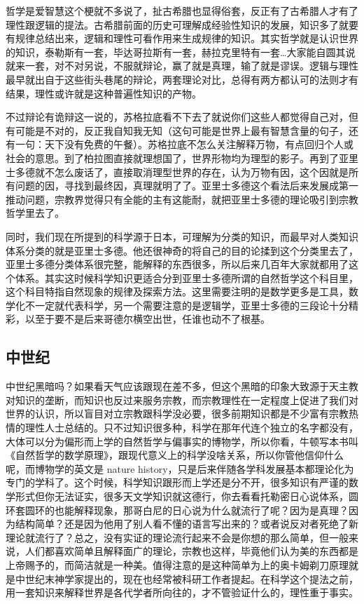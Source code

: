 \documentclass[]{tufte-book}
\begin{document}
哲学是爱智慧这个梗就不多说了，扯古希腊也显得俗套，反正有了古希腊人才有了理性跟逻辑的提法。古希腊前面的历史可理解成经验性知识的发展，知识多了就要有规律总结出来，逻辑和理性可看作用来生成规律的知识。其实哲学就是认识世界的知识，泰勒斯有一套，毕达哥拉斯有一套，赫拉克里特有一套\ldots 大家能自圆其说就来一套，对不对另说，不服就辩论，赢了就是真理，输了就是谬误。逻辑与理性最早就出自于这些街头巷尾的辩论，两套理论对比，总得有两方都认可的法则才有结果，理性或许就是这种普遍性知识的产物。

不过辩论有诡辩这一说的，苏格拉底看不下去了就说你们这些人都觉得自己对，但有可能是不对的，反正我自知我无知（这句可能是世界上最有智慧含量的句子，还有一句：天下没有免费的午餐）。苏格拉底不怎么关注解释万物，有点回归个人或社会的意思。到了柏拉图直接就理想国了，世界形物均为理型的影子。再到了亚里士多德就不怎么废话了，直接取消理型世界的存在，认为万物有因，这个因就是所有问题的因，寻找到最终因，真理就明了了。亚里士多德这个看法后来发展成第一推动问题，宗教界觉得只有全能的主有这能耐，就把亚里士多德的理论吸引到宗教哲学里去了。

同时，我们现在所提到的科学源于日本，可理解为分类的知识，而最早对人类知识体系分类的就是亚里士多德。他还很神奇的将自己的目的论揉到这个分类里去了，亚里士多德分类体系很完整，能解释的东西很多，所以后来几百年大家就都用了这个体系。其实这时候科学知识更适合分到亚里士多德所谓的自然哲学这个科目里，这个科目特指自然现象的规律及探索方法。这里需要注明的是数学更多是工具，数学化不一定就代表科学，另一个需要注意的是逻辑学，亚里士多德的三段论十分精彩，以至于要不是后来哥德尔横空出世，任谁也动不了根基。

\hypertarget{ux4e2dux4e16ux7eaa}{%
\subsection{中世纪}\label{ux4e2dux4e16ux7eaa}}

中世纪黑暗吗？如果看天气应该跟现在差不多，但这个黑暗的印象大致源于天主教对知识的垄断，而知识也反过来服务宗教，而宗教理性在一定程度上促进了我们对世界的认识，所以盲目对立宗教跟科学没必要，很多前期知识都是不少富有宗教热情的理性人士总结的。只不过知识很多种，科学在那年代连个独立的名字都没有，大体可以分为偏形而上学的自然哲学与偏事实的博物学，所以你看，牛顿写本书叫《自然哲学的数学原理》，跟现代意义上的科学没啥关系，所以你管他信仰什么呢，而博物学的英文是 nature history，只是后来伴随各学科发展基本都理论化为专门的学科了。这个时候，科学知识跟形而上学还是分不开，很多知识有严谨的数学形式但你无法证实，很多天文学知识就这德行，你去看看托勒密日心说体系，圆环套圆环的也能解释现象，那哥白尼的日心说为什么就流行了呢？因为是真理？因为结构简单？还是因为他用了别人看不懂的语言写出来的？或者说反对者死绝了新理论就流行了？总之，没有实证的理论流行起来不会是你想的那么简单，但一般来说，人们都喜欢简单且解释面广的理论，宗教也这样，毕竟他们认为美的东西都是上帝赐予的，而简洁就是一种美。值得注意的是这种简单为上的奥卡姆剃刀原理就是中世纪末神学家提出的，现在也经常被科研工作者提起。在科学这个提法之前，用一套知识来解释世界是各代学者所向往的，才不管验证什么的，理性重于事实。
\end{document}
